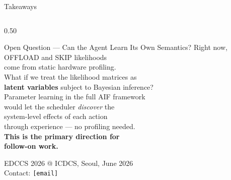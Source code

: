 \documentclass[aspectratio=169,10pt]{beamer}
\begin{document}
\begin{frame}{Takeaways}
\begin{columns}[T]
  \begin{column}{0.50\textwidth}
    \vspace{0.1cm}
    \begin{alertblock}{Open Question — Can the Agent Learn Its Own Semantics?}
      \small
      \vspace{0.2em}
      Right now, OFFLOAD and SKIP likelihoods\\
      come from static hardware profiling.\\[0.5em]
      What if we treat the likelihood matrices as\\
      \textbf{latent variables} subject to Bayesian inference?\\[0.5em]
      Parameter learning in the full AIF framework\\
      would let the scheduler \emph{discover} the\\
      system-level effects of each action\\
      through experience — no profiling needed.\\[0.5em]
      \textbf{This is the primary direction for\\
      follow-on work.}
      \vspace{0.2em}
    \end{alertblock}
    \vspace{0.5em}
    \small
    \textcolor{mygray}{
      EDCCS 2026 @ ICDCS, Seoul, June 2026\\[0.2em]
      Contact: \texttt{[email]}
    }
  \end{column}
\end{columns}
\end{frame}
\end{document}
